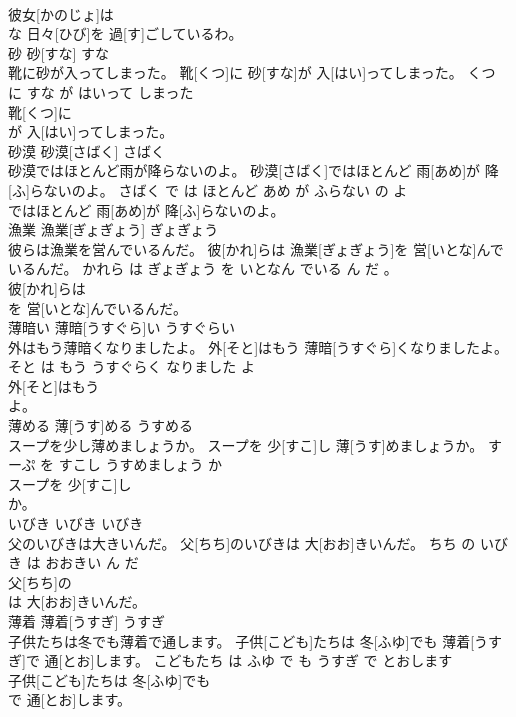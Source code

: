 \documentclass[8pt]{extreport}
\begin{document}
\begin{CJK}{UTF8}{min}
\\	彼女[かのじょ]は
\\	な 日々[ひび]を 過[す]ごしているわ。			
\\	砂	砂[すな]	すな	
\\	靴に砂が入ってしまった。	靴[くつ]に 砂[すな]が 入[はい]ってしまった。	くつ に すな が はいって しまった	
\\	靴[くつ]に
\\	が 入[はい]ってしまった。			
\\	砂漠	砂漠[さばく]	さばく	
\\	砂漠ではほとんど雨が降らないのよ。	砂漠[さばく]ではほとんど 雨[あめ]が 降[ふ]らないのよ。	さばく で は ほとんど あめ が ふらない の よ	
\\	ではほとんど 雨[あめ]が 降[ふ]らないのよ。			
\\	漁業	漁業[ぎょぎょう]	ぎょぎょう	
\\	彼らは漁業を営んでいるんだ。	彼[かれ]らは 漁業[ぎょぎょう]を 営[いとな]んでいるんだ。	かれら は ぎょぎょう を いとなん でいる ん だ 。	
\\	彼[かれ]らは
\\	を 営[いとな]んでいるんだ。			
\\	薄暗い	薄暗[うすぐら]い	うすぐらい	
\\	外はもう薄暗くなりましたよ。	外[そと]はもう 薄暗[うすぐら]くなりましたよ。	そと は もう うすぐらく なりました よ	
\\	外[そと]はもう
\\	よ。			
\\	薄める	薄[うす]める	うすめる	
\\	スープを少し薄めましょうか。	スープを 少[すこ]し 薄[うす]めましょうか。	すーぷ を すこし うすめましょう か	
\\	スープを 少[すこ]し
\\	か。			
\\	いびき	いびき	いびき	
\\	父のいびきは大きいんだ。	父[ちち]のいびきは 大[おお]きいんだ。	ちち の いびき は おおきい ん だ	
\\	父[ちち]の
\\	は 大[おお]きいんだ。			
\\	薄着	薄着[うすぎ]	うすぎ	
\\	子供たちは冬でも薄着で通します。	子供[こども]たちは 冬[ふゆ]でも 薄着[うすぎ]で 通[とお]します。	こどもたち は ふゆ で も うすぎ で とおします	
\\	子供[こども]たちは 冬[ふゆ]でも
\\	で 通[とお]します。			

\end{CJK}
\end{document}
